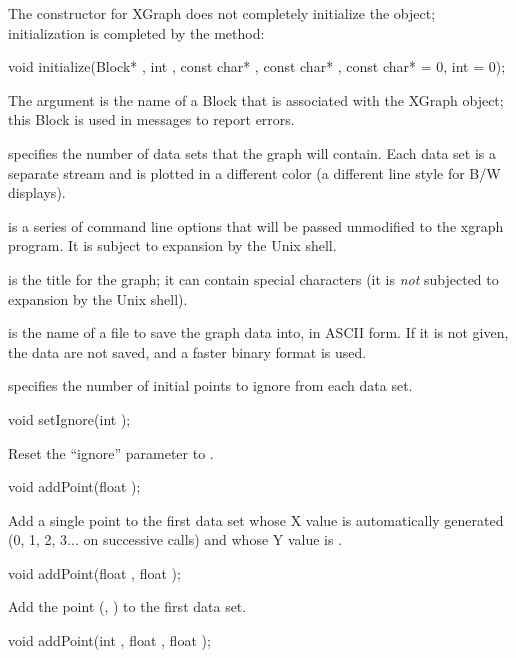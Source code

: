 The constructor for XGraph does not completely initialize the object;
initialization is completed by the  method:

\begin{example}
void initialize(Block* , int ,
     const char* , const char* ,
     const char*  = 0, int  = 0);
\end{example}

The  argument is the name of a Block that is associated
with the XGraph object; this Block is used in 
messages to report errors.

 specifies the number of data sets that the graph will
contain.  Each data set is a separate stream and is plotted in a
different color (a different line style for B/W displays).

 is a series of command line options that will be passed
unmodified to the xgraph program.  It is subject to expansion by the
Unix shell.

 is the title for the graph; it can contain special
characters (it is \emph{not} subjected to expansion by the Unix shell).

 is the name of a file to save the graph data into, in
ASCII form.  If it is not given, the data are not saved, and a faster
binary format is used.

 specifies the number of initial points to ignore from
each data set.

\begin{example}
void setIgnore(int );
\end{example}

Reset the ``ignore'' parameter to .

\begin{example}
void addPoint(float );
\end{example}

Add a single point to the first data set whose X value is
automatically generated (0, 1, 2, 3... on successive calls)
and whose Y value is .

\begin{example}
void addPoint(float , float );
\end{example}

Add the point (, ) to the first data set.

\begin{example}
void addPoint(int , float , float );
\end{example}

